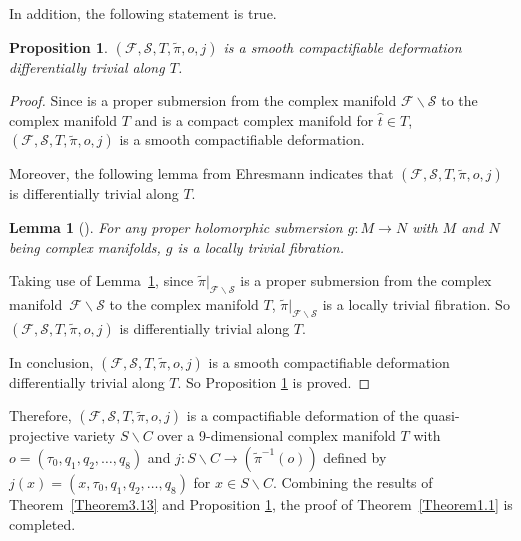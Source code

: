 \documentclass[pdftex]{sigma}
\numberwithin{equation}{section}
\newtheorem{Lemma}[Theorem]{Lemma}
\newtheorem{Proposition}[Theorem]{Proposition}
 { \theoremstyle{definition}
\newtheorem{Definition}[Theorem]{Definition}
\newtheorem{Note}[Theorem]{Note}
\newtheorem{Example}[Theorem]{Example}
\newtheorem{Remark}[Theorem]{Remark} }
\begin{document}
In addition, the following statement is true.

\begin{Proposition} \label{Proposition3.14}
$(\mathcal{F},\mathcal{S},T,\widetilde{\pi},o,j)$ is a smooth compactifiable deformation differentially trivial along $T$.
\end{Proposition}

\begin{proof}
Since  is a proper submersion from the complex manifold $\mathcal{F}\backslash \mathcal{S}$ to the complex manifold $T$ and  is a compact complex manifold for $\hat{t} \in T$, $(\mathcal{F},\mathcal{S},T,\widetilde{\pi},o,j)$ is a smooth compactifiable deformation.

Moreover, the following lemma from Ehresmann indicates that $(\mathcal{F},\mathcal{S},T,\widetilde{\pi},o,j)$ is differentially trivial along $T$.

\begin{Lemma}[{\cite[Theorem~9.3]{Claire}}] \label{Lemma3.15}
 For any proper holomorphic submersion $g\colon M\rightarrow N$ with $M$ and $N$ being complex manifolds, $g$ is a locally trivial fibration.
\end{Lemma}

Taking use of Lemma~\ref{Lemma3.15}, since $\widetilde{\pi}|_{\mathcal{F}\backslash \mathcal{S}}$ is a proper submersion from the complex manifold~$\mathcal{F}\backslash \mathcal{S}$ to the complex manifold $T$, $\widetilde{\pi}|_{\mathcal{F}\backslash \mathcal{S}}$ is a locally trivial fibration. So $(\mathcal{F},\mathcal{S},T,\widetilde{\pi},o,j)$ is differentially trivial along $T$.

In conclusion, $(\mathcal{F},\mathcal{S},T,\widetilde{\pi},o,j)$ is a smooth compactifiable deformation differentially trivial along $T$. So Proposition \ref{Proposition3.14} is proved.
\end{proof}


Therefore, $(\mathcal{F},\mathcal{S},T,\widetilde{\pi},o,j)$ is a compactifiable deformation of the quasi-projective variety $S\backslash C$ over a 9-dimensional complex manifold $T$ with $o=(\tau_0,q_1,q_2,\dots ,q_8)$ and $j\colon S \backslash C \rightarrow (\widetilde{\pi}^{-1}(o))$ defined by $j(x)=(x,\tau_0,q_1,q_2,\dots ,q_8)$ for $x \in S\backslash C$. Combining the results of Theorem~\ref{Theorem3.13} and Proposition \ref{Proposition3.14}, the proof of Theorem~\ref{Theorem1.1} is completed.
\end{document}
